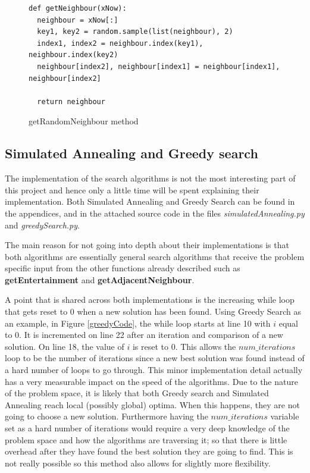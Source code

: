 \documentclass[12pt]{report}
\begin{document}
\begin{figure}[H]
\caption{getRandomNeighbour method}
\label{randomNeighbour}
\begin{lstlisting}
def getNeighbour(xNow):
  neighbour = xNow[:]
  key1, key2 = random.sample(list(neighbour), 2)
  index1, index2 = neighbour.index(key1), neighbour.index(key2)
  neighbour[index2], neighbour[index1] = neighbour[index1], neighbour[index2]
    
  return neighbour
\end{lstlisting}
\end{figure}

\subsection{Simulated Annealing and Greedy search}\label{Imp-searchAlgos}
The implementation of the search algorithms is not the most interesting part of this project and hence only a little time will be spent explaining their implementation. Both Simulated Annealing and Greedy Search can be found in the appendices, and in the attached source code in the files \textit{simulatedAnnealing.py} and \textit{greedySearch.py}.

The main reason for not going into depth about their implementations is that both algorithms are essentially general search algorithms that receive the problem specific input from the other functions already described such as \textbf{getEntertainment} and \textbf{getAdjacentNeighbour}.

A point that is shared across both implementations is the increasing while loop that gets reset to 0 when a new solution has been found. Using Greedy Search as an example, in Figure \ref{greedyCode}, the while loop starts at line 10 with $i$ equal to 0. It is incremented on line 22 after an iteration and comparison of a new solution. On line 18, the value of $i$ is reset to 0. This allows the $num\_iterations$ loop to be the number of iterations since a new best solution was found instead of a hard number of loops to go through. This minor implementation detail actually has a very measurable impact on the speed of the algorithms. Due to the nature of the problem space, it is likely that both Greedy search and Simulated Annealing reach local (possibly global) optima. When this happens, they are not going to choose a new solution. Furthermore having the $num\_iterations$ variable set as a hard number of iterations would require a very deep knowledge of the problem space and how the algorithms are traversing it; so that there is little overhead after they have found the best solution they are going to find. This is not really possible so this method also allows for slightly more flexibility.
\end{document}
